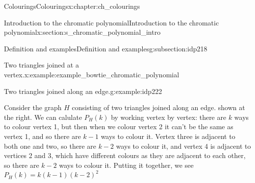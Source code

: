 \documentclass[oneside,10pt,]{book}
\numberwithin{equation}{section}
\begin{document}
\begin{chapterptx}{Colourings}{}{Colourings}{}{}{x:chapter:ch_colourings}
\begin{sectionptx}{Introduction to the chromatic polynomial}{}{Introduction to the chromatic polynomial}{}{}{x:section:s_chromatic_polynomial_intro}
\begin{subsectionptx}{Definition and examples}{}{Definition and examples}{}{}{g:subsection:idp218}
\begin{example}{Two triangles joined at a vertex.}{x:example:example_bowtie_chromatic_polynomial}
\begin{sidebyside}{2}{0.025}{0.025}{0.05}
\begin{sbspanel}{0.3}
{\begin{tikzpicture}[scale=2]
\end{tikzpicture}
}%
\end{sbspanel}%
\end{sidebyside}%
\end{example}
\begin{example}{Two triangles joined along an edge.}{g:example:idp222}%
\begin{sidebyside}{2}{0.025}{0.025}{0.05}%
\begin{sbspanel}{0.6}%
Consider the graph \(H\) consisting of two triangles joined along an edge. shown at the right.  We can calulate \(P_H(k)\) by working vertex by vertex: there are \(k\) ways to colour vertex 1, but then when we colour vertex 2 it can't be the same as vertex 1, and so there are \(k-1\) ways to colour it.  Vertex three is adjacent to both one and two, so there are \(k-2\) ways to colour it, and vertex 4 is adjacent to vertices 2 and 3, which have different colours as they are adjacent to each other, so there are \(k-2\) ways to colour it.  Putting it together, we see \(P_H(k)=k(k-1)(k-2)^2\)%
\end{sbspanel}%
\begin{sbspanel}{0.3}%
\end{sbspanel}
\end{sidebyside}
\end{example}
\end{subsectionptx}
\end{sectionptx}
\end{chapterptx}
\end{document}
